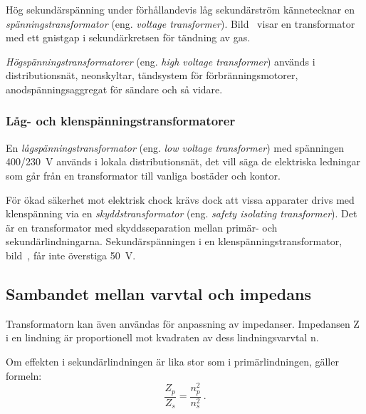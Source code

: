 Hög sekundärspänning under förhållandevis låg sekundärström kännetecknar en
\emph{spänningstransformator} (eng. \emph{voltage transformer}).
Bild~ visar en transformator med ett gnistgap i
sekundärkretsen för tändning av gas.

\emph{Högspänningstransformatorer} (eng. \emph{high voltage transformer})
används i distributionsnät, neonskyltar, tändsystem för förbränningsmotorer,
anodspänningsaggregat för sändare och så vidare.


\newpage
\subsubsection{Låg- och klenspänningstransformatorer}


En \emph{lågspänningstransformator} (eng. \emph{low voltage transformer}) med
spänningen 400/\qty{230}{\volt} används i lokala distributionsnät, det vill säga
de elektriska ledningar som går från en transformator till vanliga bostäder och
kontor.

För ökad säkerhet mot elektrisk chock krävs dock att vissa apparater drivs med
klenspänning via en \emph{skyddstransformator}
(eng. \emph{safety isolating transformer}).
Det är en transformator med skyddsseparation mellan primär- och
sekundärlindningarna.
Sekundärspänningen i en klenspänningstransformator,
bild~, får inte överstiga \qty{50}{\volt}.

\newpage
\subsection{Sambandet mellan varvtal och impedans}


Transformatorn kan även användas för anpassning av impedanser.
Impedansen Z i en lindning är proportionell mot kvadraten av dess
lindningsvarvtal n.

Om effekten i sekundärlindningen är lika stor som i primärlindningen, gäller
formeln:
%
\[\dfrac{Z_p}{Z_s} = \dfrac{n_p^2}{n_s^2}~.\]
